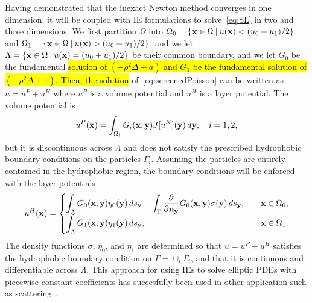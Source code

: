 %   
Having demonstrated that the inexact Newton method converges in one
dimension, it will be coupled with IE formulations to 
solve~\eqref{eq:SL} in two and three dimensions. We first partition
$\Omega$ into $\Omega_0 = \{\mathbf{x} \in \Omega \:|\: u(\mathbf{x}) < (u_0 +
u_1)/2\}$ and $\Omega_1 = \{\mathbf{x} \in \Omega \:|\: u(\mathbf{x}) > (u_0 +
u_1)/2\}$, and we let $\Lambda = \{\mathbf{x} \in \Omega \:|\: u(\mathbf{x}) = (u_0 +
u_1)/2 \}$ be their common boundary, and we let $G_0$ be the fundamental
\hl{solution of $(-\rho^2 \Delta + a)$ and $G_1$ be the fundamental
solution of $(-\rho^2 \Delta + 1)$. Then, the solution}
of~\eqref{eq:screenedPoisson} can be written as $u = u^P + u^H$ where
$u^P$ is a volume potential and $u^H$ is a layer potential. The volume
potential is
\begin{align*}
  u^{P}(\mathbf{x}) = \int_{\Omega_i} G_i(\mathbf{x},\mathbf{y}) J[u^N](\mathbf{y})\, d\mathbf{y}, 
    \quad i = 1,2,
\end{align*}
but it is discontinuous across $\Lambda$ and does not satisfy the
prescribed hydrophobic boundary conditions on the particles $\Gamma_i$.
Assuming the particles are entirely contained in the hydrophobic region,
the boundary conditions will be enforced with the layer potentials
\begin{align*}
  u^{H}(\mathbf{x}) = \begin{cases}
    \displaystyle\int_{\Lambda} G_0(\mathbf{x},\mathbf{y}) \eta_0(\mathbf{y}) \, ds_{\mathbf{y}} + 
    \displaystyle\int_{\Gamma} \frac{\partial }{\partial \mathbf{n}_{\mathbf{y}}} G_0(\mathbf{x},\mathbf{y})
      \sigma(\mathbf{y}) \,ds_{\mathbf{y}}, \quad & \mathbf{x} \in \Omega_0, \\
    \displaystyle\int_{\Lambda} G_1(\mathbf{x},\mathbf{y}) \eta_1(\mathbf{y}) \, ds_{\mathbf{y}},
     & \mathbf{x} \in \Omega_1.
  \end{cases}
\end{align*}
The density functions $\sigma$, $\eta_0$, and $\eta_1$ are determined so
that $u = u^P + u^H$ satisfies the hydrophobic boundary condition on
$\Gamma = \cup_i \Gamma_i$, and that it is continuous and differentiable
across $\Lambda$. This approach for using IEs to solve elliptic PDEs
with piecewise constant coefficients has succesfully been used in
other application such as scattering~\cite{hyu-bar2014,
che-cho-cai2018}.

